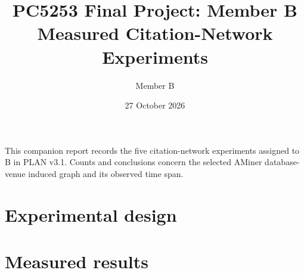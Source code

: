 \documentclass[11pt,a4paper]{article}
\title{PC5253 Final Project: Member B\\Measured Citation-Network Experiments}
\author{Member B}
\date{27 October 2026}
\begin{document}
\maketitle
\noindent This companion report records the five citation-network experiments
assigned to B in PLAN v3.1. Counts and conclusions concern the selected
AMiner database-venue induced graph and its observed time span.
\section{Experimental design}

\section{Measured results}

{\small}
\end{document}

